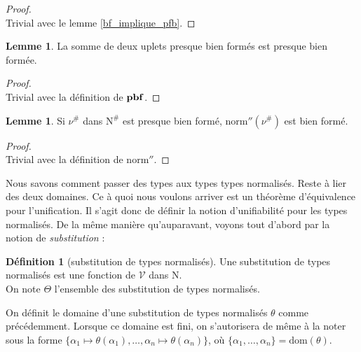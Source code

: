 \documentclass[a4paper]{report}
\newenvironment{preuve} 
  {\begin{proof}~\\} 
  {\end{proof}}
\theoremstyle{definition}
\newtheorem{definition}[theoreme]{Définition}
\newtheorem{lemme}[theoreme]{Lemme}
\newcommand{\norm}{\mathrm{norm}}
\newcommand{\V}{\mathscr{V}}
\newcommand{\N}{\mathrm{N}}
\begin{document}
\begin{preuve}
  Trivial avec le lemme \ref{bf_implique_pfb}.
\end{preuve}

\begin{lemme} \label{pbf_implique_msomme_pbf}
  La somme de deux uplets presque bien formés est presque bien formée.
\end{lemme}

\begin{preuve}
  Trivial avec la définition de $\bold{pbf}$.
\end{preuve}

\begin{lemme} \label{pbf_implique_norm''_bf}
  Si $\nu^\#$ dans $\N^\#$ est presque bien formé, $\norm'' (\nu^\#)$ est bien formé.
\end{lemme}

\begin{preuve}
  Trivial avec la définition de $\norm''$.
\end{preuve}

Nous savons comment passer des types aux types types normalisés. Reste à lier des deux domaines. Ce à quoi nous voulons arriver est un théorème d'équivalence pour l'unification. Il s'agit donc de définir la notion d'unifiabilité pour les types normalisés. De la même manière qu'auparavant, voyons tout d'abord par la notion de \emph{substitution} :

\begin{definition}[substitution de types normalisés]
  Une substitution de types normalisés est une fonction de $\V$ dans $\N$. \\
  On note $\Theta$ l'ensemble des substitution de types normalisés.
\end{definition}

On définit le domaine d'une substitution de types normalisés $\theta$ comme précédemment. Lorsque ce domaine est fini, on s'autorisera de même à la noter sous la forme $\{ \alpha_1 \mapsto \theta (\alpha_1), \dots, \alpha_n \mapsto \theta (\alpha_n) \}$, où $\{ \alpha_1, \dots, \alpha_n \} = \mathrm{dom} (\theta)$.
\end{document}
